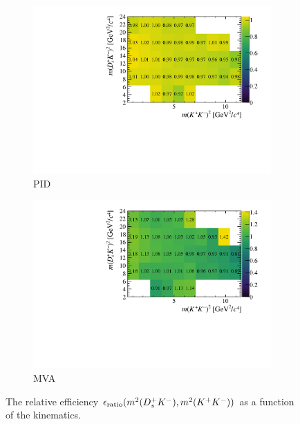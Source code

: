 \begin{figure}[!h]
   \centering
   \begin{subfigure}[t]{0.45\textwidth}
      \includegraphics[width=1.0\textwidth]{figs/B2DsKK/Relative_Eff_PID_All.pdf}
      \caption{PID}
      \label{fig:B2DsKK_releff_PID}
   \end{subfigure}
   \begin{subfigure}[t]{0.45\textwidth}
      \includegraphics[width=1.0\textwidth]{figs/B2DsKK/Relative_Eff_BDT_All.pdf}
      \caption{MVA}
      \label{fig:B2DsKK_releff_MVA}
   \end{subfigure}
   \caption{The relative efficiency $\epsilon_{\text{ratio}}(m^{2}({{D}^+_{s}}{{K}^-}),m^{2}({{K}^+}{{K}^-}))$ as a function of the \decay{\Bp}{\Dsp\Kp\Km} kinematics.}
   \label{fig:B2DsKK_dalitz_eff_three}
\end{figure}



